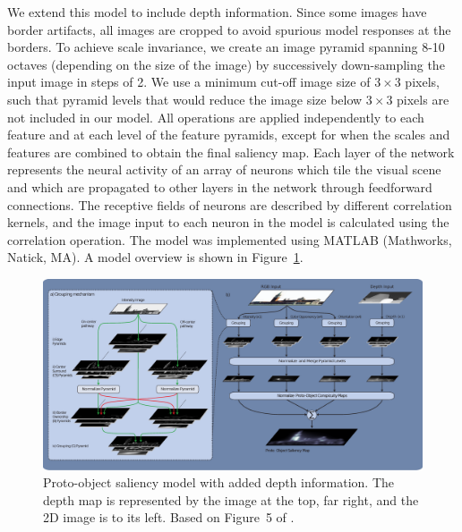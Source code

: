 We extend this model to include depth information. Since some images have border artifacts, all images are cropped to avoid spurious model responses at the borders. To achieve scale invariance, we create an image pyramid spanning 8-10 octaves (depending on the size of the image) by successively down-sampling the input image in steps of 2. We use a minimum cut-off image size of $3\times 3$ pixels, such that pyramid levels that would reduce the image size below $3\times 3$ pixels are not included in our model. All operations are applied independently to each feature and at each level of the feature pyramids, except for when the scales and features are combined to obtain the final saliency map. Each layer of the network represents the neural activity of an array of neurons which tile the visual scene and  which are propagated to other layers in the network through feedforward connections. The receptive fields of neurons are described by different correlation kernels, and the image input to each neuron in the model is calculated using the correlation operation. The model was implemented using MATLAB (Mathworks, Natick, MA). A model overview is shown in Figure~\ref{Fig:Model}.

\begin{figure}[t]
\centering
\includegraphics[width=6in]{3D-Saliency/figs/DepthSaliency_new1.eps}
\makeatletter
\let\@currsize\normalsize
\caption{Proto-object saliency model with added depth information. The depth map is represented by the image at the top, far right, and the 2D image is to its left. Based on Figure~5 of \cite{Russell_etal14}.}
\label{Fig:Model}
\end{figure}

